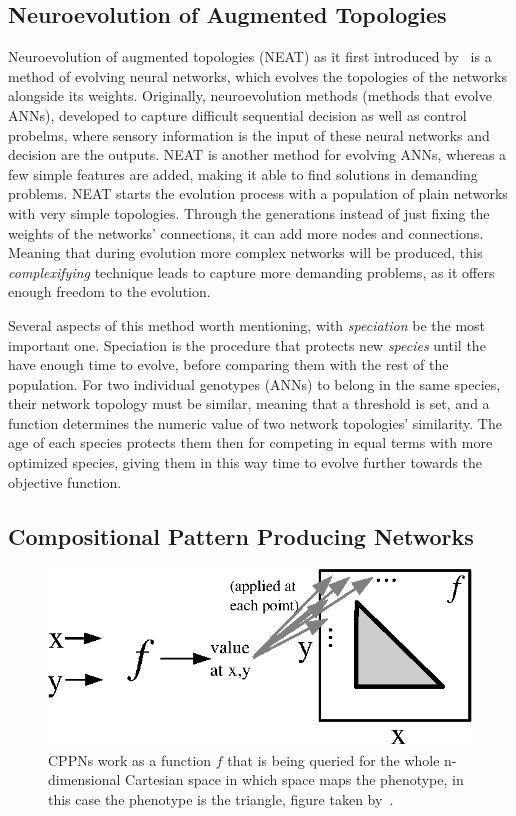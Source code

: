 \subsection*{Neuroevolution of Augmented Topologies}

Neuroevolution of augmented topologies (NEAT) as it first introduced by~\cite{stanley2002evolving} is a method of evolving neural networks, which evolves the topologies of the networks alongside its weights.
Originally, neuroevolution methods (methods that evolve ANNs), developed to capture difficult sequential decision as well as control probelms, where sensory information is the input of these neural networks and decision are the outputs. NEAT is another method for evolving ANNs, whereas a few simple features are added, making it able to find solutions in demanding problems. NEAT starts the evolution process with a population of plain networks with very simple topologies. Through the generations instead of just fixing the weights of the networks' connections, it can add more nodes and connections.
Meaning that during evolution more complex networks will be produced, this \emph{complexifying} technique leads to capture more demanding problems, as it offers enough freedom to the evolution.

Several aspects of this method worth mentioning, with \emph{speciation} be the most important one. Speciation is the procedure that protects new \emph{species} until the have enough time to evolve, before comparing them with the rest of the population. For two individual genotypes (ANNs) to belong in the same species, their network topology must be similar, meaning that a threshold is set, and a function determines the numeric value of two network topologies' similarity. The age of each species protects them then for competing in equal terms with more optimized species, giving them in this way time to evolve further towards the objective function.


\subsection*{Compositional Pattern Producing Networks}


\begin{figure}
\centering
\includegraphics{../Figures/Misc/cppnResolution.eps}
\caption{CPPNs work as a function $f$ that is being queried for the whole n-dimensional Cartesian space in which space maps the phenotype, in this case the phenotype is the triangle, figure taken by~\cite{stanley2007compositional}.}
\label{fig:cppnResolution}
\end{figure}




